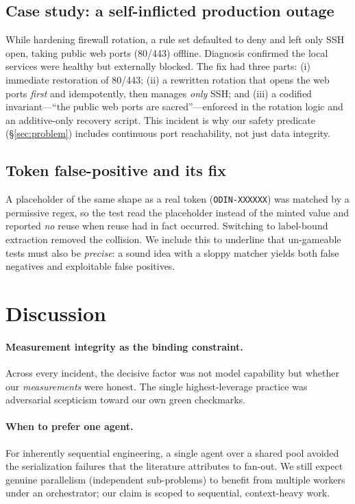 \documentclass[10pt,twocolumn]{article}
\begin{document}
\subsection{Case study: a self-inflicted production outage}
While hardening firewall rotation, a rule set defaulted to deny and left only
SSH open, taking public web ports (80/443) offline. Diagnosis confirmed the
local services were healthy but externally blocked. The fix had three parts:
(i) immediate restoration of 80/443; (ii) a rewritten rotation that opens the
web ports \emph{first} and idempotently, then manages \emph{only} SSH; and
(iii) a codified invariant---``the public web ports are sacred''---enforced in
the rotation logic and an additive-only recovery script. This incident is why
our safety predicate (\S\ref{sec:problem}) includes continuous port
reachability, not just data integrity.

\subsection{Token false-positive and its fix}
A placeholder of the same shape as a real token (\texttt{ODIN-XXXXXX}) was
matched by a permissive regex, so the test read the placeholder instead of the
minted value and reported \emph{no} reuse when reuse had in fact occurred.
Switching to label-bound extraction removed the collision. We include this to
underline that un-gameable tests must also be \emph{precise}: a sound idea with
a sloppy matcher yields both false negatives and exploitable false positives.

\section{Discussion}
\paragraph{Measurement integrity as the binding constraint.}
Across every incident, the decisive factor was not model capability but whether
our \emph{measurements} were honest. The single highest-leverage practice was
adversarial scepticism toward our own green checkmarks.

\paragraph{When to prefer one agent.}
For inherently sequential engineering, a single agent over a shared pool
avoided the serialization failures that the literature attributes to fan-out.
We still expect genuine parallelism (independent sub-problems) to benefit from
multiple workers under an orchestrator; our claim is scoped to sequential,
context-heavy work.
\end{document}
